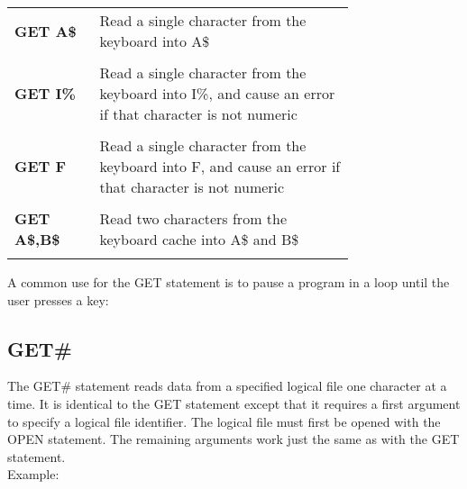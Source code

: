 \begin{tabular}{l p{0.75\linewidth}}

	{\ttfamily\bfseries GET A\$} & Read a single character from the keyboard into {\ttfamily A\$}\\\\

	{\ttfamily\bfseries GET I\%} & Read a single character from the keyboard
	into {\ttfamily I\%}, and cause an error if that character is not
	numeric\\\\

	{\ttfamily\bfseries GET F} & Read a single character from the keyboard into
	{\ttfamily F}, and cause an error if that character is not numeric\\\\

	{\ttfamily\bfseries GET A\$,B\$} & Read two characters from the keyboard
	cache into {\ttfamily A\$} and {\ttfamily B\$}\\\\

\end{tabular}

\vspace{16pt}

A common use for the {\ttfamily GET} statement is to pause a program in a loop until the user presses a key:\\


\subsection{GET\#}

The {\ttfamily GET\#} statement reads data from a specified logical file one
character at a time.  It is identical to the {\ttfamily GET} statement except
that it requires a first argument to specify a logical file identifier.  The
logical file must first be opened with the {\ttfamily OPEN} statement.  The
remaining arguments work just the same as with the {\ttfamily GET} statement.\\

Example:\\


